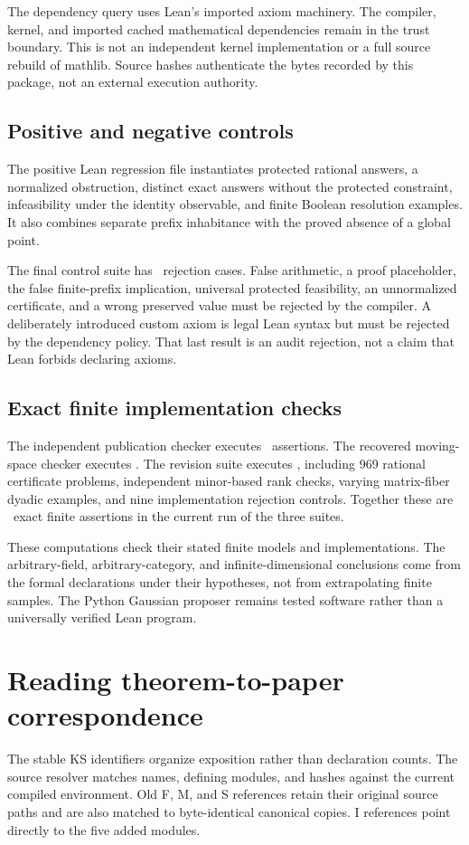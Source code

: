 \documentclass[11pt]{article}
\begin{document}
The dependency query uses Lean's imported axiom machinery. The compiler, kernel, and imported cached mathematical dependencies remain in the trust boundary. This is not an independent kernel implementation or a full source rebuild of mathlib. Source hashes authenticate the bytes recorded by this package, not an external execution authority.

\subsection{Positive and negative controls}
The positive Lean regression file instantiates protected rational answers, a normalized obstruction, distinct exact answers without the protected constraint, infeasibility under the identity observable, and finite Boolean resolution examples. It also combines separate prefix inhabitance with the proved absence of a global point.

The final control suite has \EditionNegativeControls\ rejection cases. False arithmetic, a proof placeholder, the false finite-prefix implication, universal protected feasibility, an unnormalized certificate, and a wrong preserved value must be rejected by the compiler. A deliberately introduced custom axiom is legal Lean syntax but must be rejected by the dependency policy. That last result is an audit rejection, not a claim that Lean forbids declaring axioms.

\subsection{Exact finite implementation checks}
The independent publication checker executes \EditionOriginalChecks\ assertions. The recovered moving-space checker executes \EditionRecoveredChecks. The revision suite executes \EditionRevisionChecks, including 969 rational certificate problems, independent minor-based rank checks, varying matrix-fiber dyadic examples, and nine implementation rejection controls. Together these are \EditionTotalChecks\ exact finite assertions in the current run of the three suites.

These computations check their stated finite models and implementations. The arbitrary-field, arbitrary-category, and infinite-dimensional conclusions come from the formal declarations under their hypotheses, not from extrapolating finite samples. The Python Gaussian proposer remains tested software rather than a universally verified Lean program.

\section{Reading theorem-to-paper correspondence}
The stable KS identifiers organize exposition rather than declaration counts. The source resolver matches names, defining modules, and hashes against the current compiled environment. Old F, M, and S references retain their original source paths and are also matched to byte-identical canonical copies. I references point directly to the five added modules.
\end{document}

